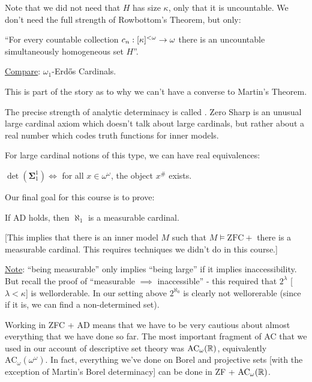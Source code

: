 \documentclass[]{article}
\newcommand{\om}{\omega}
\newcommand{\lom}{{<\omega}}
\renewcommand{\ac}{\textrm{AC}}
\newcommand{\bosig}{\bm{\Sigma}}
\newcommand{\zfc}{\textrm{ZFC}}
\newcommand{\ad}{\textrm{AD}}
\begin{document}
\begin{remark*}
    Note that we did not need that $H$ has size $\kappa$, only that it is uncountable. We don't need the full strength of Rowbottom's Theorem, but only:
    
    ``For every countable collection $c_n:[\kappa]^\lom \ra \om$ there is an uncountable simultaneously homogeneous set $H$''.

    \underline{Compare}: $\om_1$-Erd\H{o}s Cardinals.

    This is part of the story as to why we can't have a converse to Martin's Theorem.

    The precise strength of analytic determinacy is called . Zero Sharp is an unusual large cardinal axiom which doesn't talk about large cardinals, but rather about a real number which codes truth functions for inner models.

    For large cardinal notions of this type, we can have real equivalences:

    \begin{theorem*}[ZFC]
        $\det(\bosig^1_1)\iff$ for all $x \in \om^\om$, the object $x^{\#}$ exists.
    \end{theorem*}
\end{remark*}

Our final goal for this course is to prove:

\begin{theorem*}[Solovay]
    If $\ad$ holds, then $\aleph_1$ is a measurable cardinal.
\end{theorem*}

[This implies that there is an inner model $M$ such that $M\models \zfc +$ there is a measurable cardinal. This requires techniques we didn't do in this course.]

\underline{Note}: ``being measurable'' only implies ``being large'' if it implies inaccessibility. But recall the proof of ``measurable $\implies$ inaccessible'' - this required that $2^\lambda$ [$\lambda < \kappa$] is wellorderable. In our setting above $2^{\aleph_0}$ is clearly not wellorerable (since if it is, we can find a non-determined set).

Working in ZFC + AD means that we have to be very cautious about almost everything that we have done so far. The most important fragment of AC that we used in our account of descriptive set theory was $\ac_\om(\R)$, equivalently $\ac_\om(\om^\om)$. In fact, everything we've done on Borel and projective sets [with the exception of Martin's Borel determinacy] can be done in ZF + $\ac_\om(\R)$.
\end{document}
